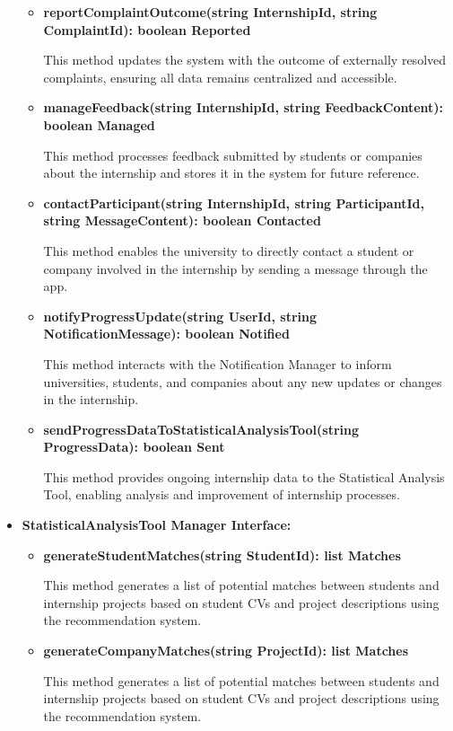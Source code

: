 \begin{itemize}
\begin{itemize}
    \item \textbf{reportComplaintOutcome(string InternshipId, string ComplaintId): boolean Reported}

    This method updates the system with the outcome of externally resolved complaints, ensuring all data remains centralized and accessible.

    \item \textbf{manageFeedback(string InternshipId, string FeedbackContent): boolean Managed}

    This method processes feedback submitted by students or companies about the internship and stores it in the system for future reference.

    \item \textbf{contactParticipant(string InternshipId, string ParticipantId, string MessageContent): boolean Contacted}

    This method enables the university to directly contact a student or company involved in the internship by sending a message through the app.

    \item \textbf{notifyProgressUpdate(string UserId, string NotificationMessage): boolean Notified}

    This method interacts with the Notification Manager to inform universities, students, and companies about any new updates or changes in the internship.

    \item \textbf{sendProgressDataToStatisticalAnalysisTool(string ProgressData): boolean Sent}

    This method provides ongoing internship data to the Statistical Analysis Tool, enabling analysis and improvement of internship processes.
    \end{itemize}
    

\item \textbf{StatisticalAnalysisTool Manager Interface:}
\begin{itemize}
    \item \textbf{generateStudentMatches(string StudentId): list Matches}

    This method generates a list of potential matches between students and internship projects based on student CVs and project descriptions using the recommendation system.

    \item \textbf{generateCompanyMatches(string ProjectId): list Matches}

    This method generates a list of potential matches between students and internship projects based on student CVs and project descriptions using the recommendation system.


\end{itemize}
\end{itemize}
